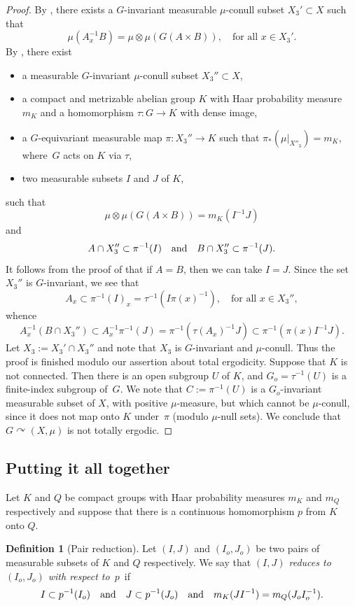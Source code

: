\documentclass[JEP,XML,SOM,Unicode]{cedram}
\newcommand{\qand}{\quad\textup{and}\quad}
\let\acts\curvearrowright
\theoremstyle{plain}
\theoremstyle{definition}
\newtheorem{definition}[theorem]{Definition}
\begin{document}
\begin{proof}
By \cite[Lem.\,5.3]{BF}, there exists a $G$-invariant measurable $\mu$-conull subset \hbox{$X_3' \subset X$} such that
\[
\mu(A_x^{-1}B) = \mu \otimes \mu(G(A \times B)), \quad \textrm{for all $x \in X_3'$}.
\]
By \cite[Th.\,5.1]{BF}, there exist
\begin{itemize}
\item a measurable $G$-invariant $\mu$-conull subset $X_3'' \subset X$,
\item a compact and metrizable abelian group $K$ with Haar probability measure $m_K$ and
a homomorphism $\tau : G \to K$ with dense image,
\item a $G$-equivariant measurable map $\pi : X_3''\!\to\!K$ such that $\pi_*(\mu |_{X''_3})\!=\!m_K$, where~$G$ acts on $K$ via $\tau$,
\item two measurable subsets $I$ and $J$ of $K$,
\end{itemize}
such that
\[
\mu \otimes \mu (G(A \times B)) = m_K(I^{-1}J)
\]
and
\[
A \cap X_3'' \subset \pi^{-1}(I) \qand B \cap X_3'' \subset \pi^{-1}(J).
\]
It follows from the proof of \cite[Th.\,5.1]{BF} that if $A = B$, then we can take $I = J$. Since the set $X_3''$ is $G$-invariant,
we see that
\[
A_x \subset \pi^{-1}(I)_x = \tau^{-1}(I\pi(x)^{-1}), \quad \textrm{for all $x \in X_3''$},
\]
whence
\[
A_x^{-1}(B \cap X_3'') \subset A_x^{-1}\pi^{-1}(J) = \pi^{-1}(\tau(A_x)^{-1}J) \subset \pi^{-1}(\pi(x) I^{-1}J).
\]
Let $X_3 := X_3' \cap X_3''$ and note that $X_3$ is $G$-invariant and $\mu$-conull. Thus the proof is finished modulo our assertion about total ergodicity. Suppose that $K$ is not connected. Then there is an open subgroup $U$ of $K$, and $G_o = \tau^{-1}(U)$ is a finite-index
subgroup of~$G$. We note that $C := \pi^{-1}(U)$ is a $G_o$-invariant measurable subset of $X$, with positive $\mu$-measure, but
which cannot be $\mu$-conull, since it does not map onto $K$ under~$\pi$ (modulo $\mu$-null sets). We conclude that $G \acts (X,\mu)$
is not totally ergodic.
\end{proof}

\subsection{Putting it all together}

Let $K$ and $Q$ be compact groups with Haar probability measures $m_K$ and $m_Q$ respectively and
suppose that there is a continuous homomorphism $p$ from $K$ onto $Q$.

\begin{definition}[Pair reduction]
\label{def_reduction}
Let $(I,J)$ and $(I_o,J_o)$ be two pairs of measurable subsets of $K$ and $Q$ respectively. We say
that \emph{$(I,J)$ reduces to $(I_o,J_o)$ with respect to~$p$}~if
\[
I \subset p^{-1}(I_o) \qand J \subset p^{-1}(J_o) \qand m_K(J I^{-1}) = m_Q(J_o I_o^{-1}).
\]
\end{definition}
\end{document}
